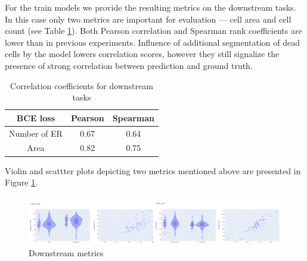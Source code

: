 
For the train models we provide the resulting metrics on the downstream tasks. In this case only two metrics are important for evaluation --- cell area and cell count (see Table \ref{table:gfp-metrics}). Both Pearson correlation and Spearman rank coefficients are lower than in previous experiments. Influence of additional segmentation of dead cells by the model lowers correlation scores, however they still signalize the presence of strong correlation between prediction and ground truth. 
\begin{table}[H]
    \centering
    \caption{Correlation coefficients for downstream tasks}
        \begin{adjustbox}{width=0.4\textwidth}
            \begin{tabular}{|c|c|c|}\hline
                BCE loss&Pearson&Spearman
                \\\hline\hline
                Number of ER&0.67&0.64\\\hline
                Area&0.82&0.75\\\hline
            \end{tabular}
            \label{table:gfp-metrics}
        \end{adjustbox}
\end{table}

Violin and scattter plots depicting two metrics mentioned above are presented in Figure \ref{fig:gfp-bce-metrics}.
\begin{figure}[H]
	\begin{center}
		\includegraphics[width=\linewidth]{bilder/gfp/binary-bce/gfp-bce-metrics.png}
		\caption{Downstream metrics}\label{fig:gfp-bce-metrics}
	\end{center}
\end{figure}